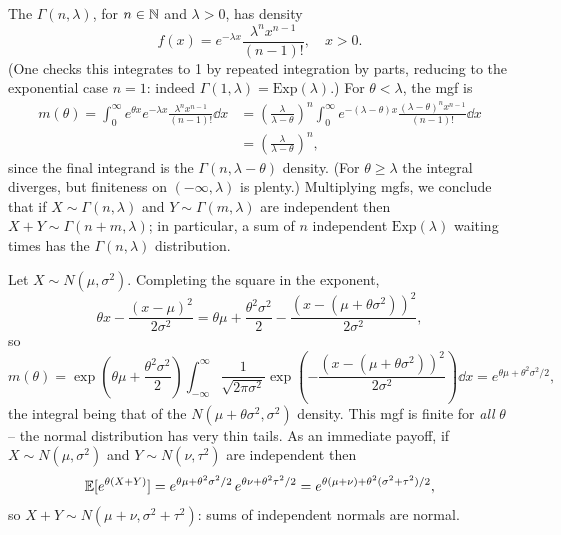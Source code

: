 \documentclass[a4paper]{scrartcl}
\begin{document}
\begin{example}
	The  $\Gamma(n, \lambda)$, for $n \in \mathbb{N}$ and $\lambda > 0$, has density
	$$
	f(x) = e^{-\lambda x}\frac{\lambda^n x^{n - 1}}{(n-1)!}, \quad x > 0.
	$$
	(One checks this integrates to 1 by repeated integration by parts, reducing to the exponential case $n = 1$: indeed $\Gamma(1, \lambda) = \mathrm{Exp}(\lambda)$.) For $\theta < \lambda$, the mgf is
	\begin{align*}
		m(\theta) = \int_0^{\infty} e^{\theta x}e^{-\lambda x}\frac{\lambda^n x^{n-1}}{(n-1)!}\dd x &= \left(\frac{\lambda}{\lambda - \theta}\right)^n \int_0^{\infty} e^{-(\lambda - \theta)x}\frac{(\lambda - \theta)^n x^{n - 1}}{(n-1)!}\dd x \\
		&= \left(\frac{\lambda}{\lambda - \theta}\right)^n,
	\end{align*}
	since the final integrand is the $\Gamma(n, \lambda - \theta)$ density. (For $\theta \geq \lambda$ the integral diverges, but finiteness on $(-\infty, \lambda)$ is plenty.) Multiplying mgfs, we conclude that if $X \sim \Gamma(n, \lambda)$ and $Y \sim \Gamma(m, \lambda)$ are independent then $X + Y \sim \Gamma(n + m, \lambda)$; in particular, a sum of $n$ independent $\mathrm{Exp}(\lambda)$ waiting times has the $\Gamma(n, \lambda)$ distribution.
\end{example}

\begin{example}
	Let $X \sim N(\mu, \sigma^2)$. Completing the square in the exponent,
	$$
	\theta x - \frac{(x - \mu)^2}{2\sigma^2} = \theta\mu + \frac{\theta^2\sigma^2}{2} - \frac{\left(x - (\mu + \theta\sigma^2)\right)^2}{2\sigma^2},
	$$
	so
	$$
	m(\theta) = \exp\left(\theta\mu + \frac{\theta^2\sigma^2}{2}\right)\int_{-\infty}^{\infty} \frac{1}{\sqrt{2\pi\sigma^2}}\exp\left(-\frac{(x - (\mu + \theta\sigma^2))^2}{2\sigma^2}\right)\dd x = e^{\theta\mu + \theta^2\sigma^2/2},
	$$
	the integral being that of the $N(\mu + \theta\sigma^2, \sigma^2)$ density. This mgf is finite for \emph{all} $\theta$ -- the normal distribution has very thin tails. As an immediate payoff, if $X \sim N(\mu, \sigma^2)$ and $Y \sim N(\nu, \tau^2)$ are independent then
	$$
	\mathbb{E}[e^{\theta(X + Y)}] = e^{\theta\mu + \theta^2\sigma^2/2}\, e^{\theta\nu + \theta^2\tau^2/2} = e^{\theta(\mu + \nu) + \theta^2(\sigma^2 + \tau^2)/2},
	$$
	so $X + Y \sim N(\mu + \nu, \sigma^2 + \tau^2)$: sums of independent normals are normal.
\end{example}
\end{document}
